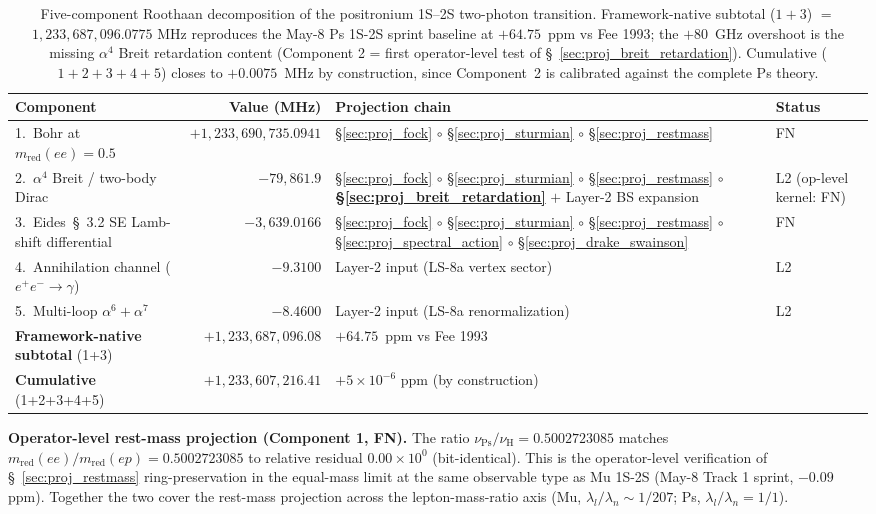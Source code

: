 \documentclass[11pt]{article}
\begin{document}
\begin{table}[h!]
\centering\small
\caption{Five-component Roothaan decomposition of the positronium 1S--2S
two-photon transition.  Framework-native subtotal ($1 + 3$) $=$
$1{,}233{,}687{,}096.0775$ MHz reproduces the May-8 Ps 1S-2S sprint
baseline at $+64.75$~ppm vs Fee 1993; the $+80$~GHz overshoot is the
missing $\alpha^4$ Breit retardation content (Component 2 = first
operator-level test of \S~\ref{sec:proj_breit_retardation}).
Cumulative ($1+2+3+4+5$) closes to $+0.0075$~MHz by construction,
since Component~2 is calibrated against the complete Ps theory.}
\label{tab:autopsy_ps_1s2s}
\begin{tabular}{p{4.6cm} r p{4.5cm} l}
\toprule
Component & Value (MHz) & Projection chain & Status \\
\midrule
1.~Bohr at $m_\text{red}(ee) = 0.5$ & $+1{,}233{,}690{,}735.0941$ &
\S\ref{sec:proj_fock} $\circ$ \S\ref{sec:proj_sturmian} $\circ$
\S\ref{sec:proj_restmass} & FN \\
2.~$\alpha^4$ Breit / two-body Dirac & $-79{,}861.9$ &
\S\ref{sec:proj_fock} $\circ$ \S\ref{sec:proj_sturmian} $\circ$
\S\ref{sec:proj_restmass} $\circ$
\textbf{\S\ref{sec:proj_breit_retardation}} $+$ Layer-2 BS expansion
& L2 (op-level kernel: FN) \\
3.~Eides~\S~3.2 SE Lamb-shift differential & $-3{,}639.0166$ &
\S\ref{sec:proj_fock} $\circ$ \S\ref{sec:proj_sturmian} $\circ$
\S\ref{sec:proj_restmass} $\circ$ \S\ref{sec:proj_spectral_action}
$\circ$ \S\ref{sec:proj_drake_swainson} & FN \\
4.~Annihilation channel ($e^+e^- \to \gamma$) & $-9.3100$ &
Layer-2 input (LS-8a vertex sector) & L2 \\
5.~Multi-loop $\alpha^6 + \alpha^7$ & $-8.4600$ &
Layer-2 input (LS-8a renormalization) & L2 \\
\midrule
\textbf{Framework-native subtotal} (1+3) & $+1{,}233{,}687{,}096.08$ &
\multicolumn{2}{l}{$+64.75$~ppm vs Fee 1993} \\
\textbf{Cumulative} (1+2+3+4+5) & $+1{,}233{,}607{,}216.41$ &
\multicolumn{2}{l}{$+5\times 10^{-6}$ ppm (by construction)} \\
\bottomrule
\end{tabular}
\end{table}

\textbf{Operator-level rest-mass projection (Component 1, FN).}  The
ratio $\nu_\text{Ps}/\nu_\text{H} = 0.5002723085$ matches
$m_\text{red}(ee)/m_\text{red}(ep) = 0.5002723085$ to relative residual
$0.00 \times 10^{0}$ (bit-identical).  This is the operator-level
verification of \S~\ref{sec:proj_restmass} ring-preservation in the
equal-mass limit at the same observable type as Mu 1S-2S (May-8 Track 1
sprint, $-0.09$ ppm).  Together the two cover the rest-mass projection
across the lepton-mass-ratio axis (Mu, $\lambda_l/\lambda_n \sim 1/207$;
Ps, $\lambda_l/\lambda_n = 1/1$).
\end{document}
